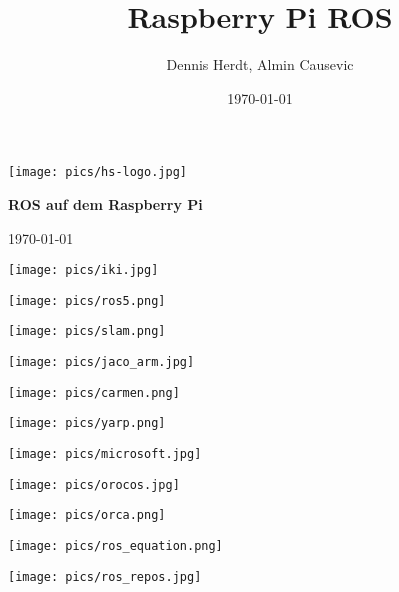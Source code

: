 \documentclass{beamer}
\title[Rapi]{Raspberry Pi ROS}
\author[D. Herdt, A. Causevic]{Dennis Herdt, Almin Causevic}
\institute[I_HS Wgt-Rav]{Informatik HS Weingarten-Ravensburg}
\date{\today}
\begin{document}
\begin{frame}[fragile]

\texttt{[image: pics/hs-logo.jpg]}


\vspace{1cm}

\begin{center}

{\bf \huge ROS auf dem Raspberry Pi}
\vspace{2cm}

\today

\end{center}
\end{frame}

\begin{frame}
\centerline{\texttt{[image: pics/iki.jpg]}}
\end{frame}

\begin{frame}
\centerline{\texttt{[image: pics/ros5.png]}}
\end{frame}

\begin{frame}
\centerline{\texttt{[image: pics/slam.png]}}
\end{frame}

\begin{frame}
\centerline{\texttt{[image: pics/jaco\_arm.jpg]}}
\end{frame}

\begin{frame}
\parbox{5cm}{\texttt{[image: pics/carmen.png]}}
\parbox{5cm}{\texttt{[image: pics/yarp.png]}}
\parbox{5cm}{\texttt{[image: pics/microsoft.jpg]}}
\hspace{5cm}
\parbox{5cm}{\texttt{[image: pics/orocos.jpg]}}
\parbox{5cm}{\texttt{[image: pics/orca.png]}}
\end{frame}

\begin{frame}
\centerline{\texttt{[image: pics/ros\_equation.png]}}
\end{frame}

\begin{frame}
\centerline{\texttt{[image: pics/ros\_repos.jpg]}}
\end{frame}
\end{document}
